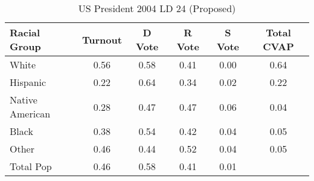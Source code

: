 \begin{table}[htb]
\begin{center}
\caption{US President 2004 LD 24 (Proposed)}
\label{pres04_cvap_ld_24}
\begin{tabular}{lccccc}
  \hline
Racial Group & Turnout & D Vote & R Vote & S Vote & Total CVAP \\ 
  \hline
White & 0.56 & 0.58 & 0.41 & 0.00 & 0.64 \\ 
  Hispanic & 0.22 & 0.64 & 0.34 & 0.02 & 0.22 \\ 
  Native American & 0.28 & 0.47 & 0.47 & 0.06 & 0.04 \\ 
  Black & 0.38 & 0.54 & 0.42 & 0.04 & 0.05 \\ 
  Other & 0.46 & 0.44 & 0.52 & 0.04 & 0.05 \\ 
  Total Pop & 0.46 & 0.58 & 0.41 & 0.01 &  \\ 
   \hline
\end{tabular}
\end{center}
\end{table}
